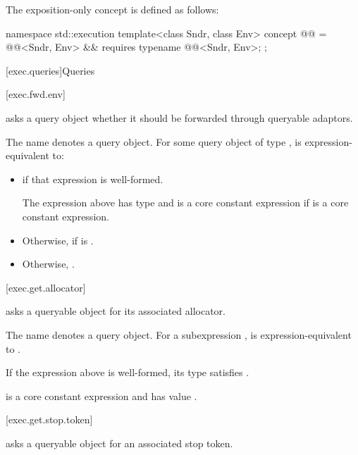 \pnum
The exposition-only concept  is defined as follows:
\begin{codeblock}
namespace std::execution {
  template<class Sndr, class Env>
    concept @@ = @@<Sndr, Env> &&
      requires {
        typename @@<Sndr, Env>;
      };
}
\end{codeblock}

[exec.queries]{Queries}

[exec.fwd.env]{}

\pnum
{} asks a query object
whether it should be forwarded through queryable adaptors.

\pnum
The name  denotes a query object.
For some query object  of type ,
 is expression-equivalent to:
\begin{itemize}
\item
{}
if that expression is well-formed.

\mandates
The expression above has type  and
is a core constant expression if  is a core constant expression.
\item
Otherwise,  if  is .
\item
Otherwise, .
\end{itemize}

[exec.get.allocator]{}

\pnum
{} asks a queryable object for its associated allocator.

\pnum
The name  denotes a query object.
For a subexpression ,
 is expression-equivalent to
.

\mandates
If the expression above is well-formed,
its type satisfies
.

\pnum
{} is a core constant expression and
has value .

[exec.get.stop.token]{}

\pnum
{} asks a queryable object for an associated stop token.

